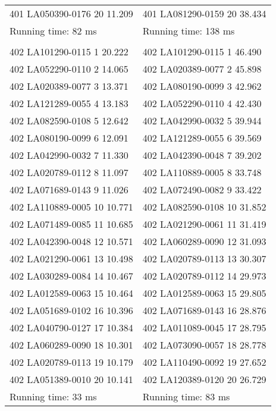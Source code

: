 \begin{tabular}{ l l }
401 LA050390-0176 20 11.209 & 401 LA081290-0159 20 38.434\\
Running time: 82 ms & Running time: 138 ms\\
\\
402 LA101290-0115 1 20.222 & 402 LA101290-0115 1 46.490\\
402 LA052290-0110 2 14.065 & 402 LA020389-0077 2 45.898\\
402 LA020389-0077 3 13.371 & 402 LA080190-0099 3 42.962\\
402 LA121289-0055 4 13.183 & 402 LA052290-0110 4 42.430\\
402 LA082590-0108 5 12.642 & 402 LA042990-0032 5 39.944\\
402 LA080190-0099 6 12.091 & 402 LA121289-0055 6 39.569\\
402 LA042990-0032 7 11.330 & 402 LA042390-0048 7 39.202\\
402 LA020789-0112 8 11.097 & 402 LA110889-0005 8 33.748\\
402 LA071689-0143 9 11.026 & 402 LA072490-0082 9 33.422\\
402 LA110889-0005 10 10.771 & 402 LA082590-0108 10 31.852\\
402 LA071489-0085 11 10.685 & 402 LA021290-0061 11 31.419\\
402 LA042390-0048 12 10.571 & 402 LA060289-0090 12 31.093\\
402 LA021290-0061 13 10.498 & 402 LA020789-0113 13 30.307\\
402 LA030289-0084 14 10.467 & 402 LA020789-0112 14 29.973\\
402 LA012589-0063 15 10.464 & 402 LA012589-0063 15 29.805\\
402 LA051689-0102 16 10.396 & 402 LA071689-0143 16 28.876\\
402 LA040790-0127 17 10.384 & 402 LA011089-0045 17 28.795\\
402 LA060289-0090 18 10.301 & 402 LA073090-0057 18 28.778\\
402 LA020789-0113 19 10.179 & 402 LA110490-0092 19 27.652\\
402 LA051389-0010 20 10.141 & 402 LA120389-0120 20 26.729\\
Running time: 33 ms & Running time: 83 ms
\end{tabular}
\newpage
